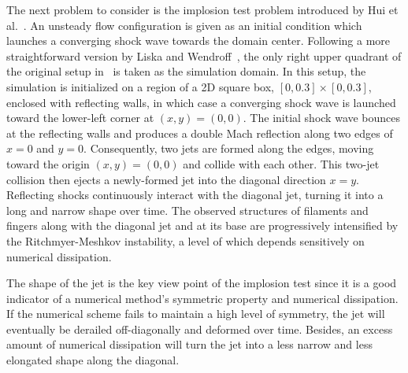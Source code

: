 The next problem to consider is the implosion test problem
introduced by Hui et al.~\cite{hui1999unified}.
An unsteady flow configuration is given as an initial condition which launches
a converging shock wave towards the domain center.
Following a more straightforward version by Liska and Wendroff~\cite{liska2003comparison},
the only right upper quadrant
of the original setup in~\cite{hui1999unified} is taken
as the simulation domain.
In this setup, the simulation is initialized on a region of a 2D square box,
\( \left[ 0, 0.3 \right] \times \left[ 0, 0.3 \right] \),
enclosed with reflecting walls,
in which case a converging shock wave is launched toward the lower-left corner
at $(x,y)=(0,0)$.
The initial shock wave bounces at the reflecting walls and produces a double Mach
reflection along two edges of $x=0$ and $y=0$.
Consequently, two jets are formed along the edges, moving toward the origin $(x,y)=(0,0)$ and collide
with each other. This two-jet collision then ejects a newly-formed jet into the diagonal direction
$x=y$. Reflecting shocks continuously interact with the diagonal jet, turning it into
a long and narrow shape over time. The observed structures of filaments and fingers
along with the diagonal jet and at its base are progressively intensified by the
Ritchmyer-Meshkov instability, a level of which depends sensitively on
numerical dissipation.

The shape of the jet is the key view point of
the implosion test since it is a good indicator of
a numerical method's symmetric property and numerical dissipation.
If the numerical scheme fails to maintain a high level of symmetry,
the jet will eventually be derailed off-diagonally and deformed over time.
Besides, an excess amount of numerical dissipation will
turn the jet into a less narrow and less elongated shape along the diagonal.

